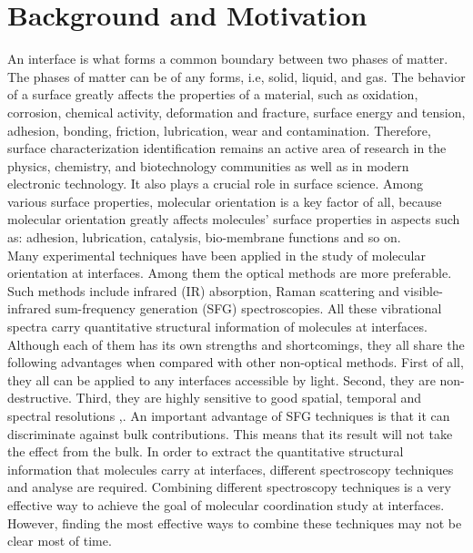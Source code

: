  \label{ch:1}
\section{Background and Motivation}
An interface is what forms a common boundary between two phases of matter. The phases of matter can be of any forms, i.e, solid, liquid, and gas. The behavior of a surface greatly affects the properties of a material, such as oxidation, corrosion, chemical activity, deformation and fracture, surface energy and tension, adhesion, bonding, friction, lubrication, wear and contamination. Therefore, surface characterization identification remains an active area of research in the physics, chemistry, and biotechnology communities as well as in modern electronic technology. It also plays a crucial role in surface science. Among various surface properties, molecular orientation is a key factor of all, because molecular orientation greatly affects molecules' surface properties in aspects such as: adhesion, lubrication, catalysis, bio-membrane functions and so on. \cite{PhysRevB.59.12632}\\

Many experimental techniques have been applied in the study of molecular orientation at interfaces. Among them the optical methods are more preferable. Such methods include infrared (IR) absorption, Raman scattering and visible-infrared sum-frequency generation (SFG) spectroscopies. All these vibrational spectra carry quantitative structural information of molecules at interfaces. Although each of them has its own strengths and shortcomings, they all share the following advantages when compared with other non-optical methods. First of all, they all can be applied to any interfaces accessible by light. Second, they are non-destructive. Third, they are highly sensitive to good spatial, temporal and spectral resolutions \cite{Brasselet:11},\cite{PhysRevB.59.12632}. An important advantage of SFG techniques is that it can discriminate against bulk contributions. This means that its result will not take the effect from the bulk. In order to extract the quantitative structural information that molecules carry at interfaces, different spectroscopy techniques and analyse are required. Combining different spectroscopy techniques is a very effective way to achieve the goal of molecular coordination study at interfaces. However, finding the most effective ways to combine these techniques may not be clear most of time.\\

